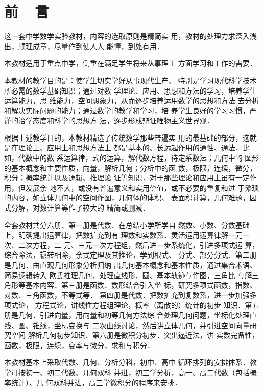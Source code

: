 \chapter{前~~言}

这一套中学数学实验教材，内容的选取原则是精简实
用，教材的处理力求深入浅出，顺理成章，尽量作到使人人
能懂，到处有用．

    本教材适用于重点中学，侧重在满足学生将来从事理工
方面学习和工作的需要．

    本教材的教学目的是：使学生切实学好从事现代生产、
特别是学习现代科学技术所必需的数学基础知识；通过对数
学理论、应用、思想和方法的学习，培养学生运算能力，思
维能力，空间想象力，从而逐步培养运用数学的思想和方法
去分析和解决实际问题的能力；通过数学的教学和学习，培
养学生良好的学习习惯，严谨的治学态度和科学的思想方
法，逐步形成辩证唯物主义世界观．

   根据上述教学目的，本教材精选了传统数学那些普遍实
用的最基础的部分，这就是在理论上、应用上和思想方法上
都是基本的、长远起作用的通性、通法．比如，代数中的数
系运算律，式的运算，解代数方程，待定系数法；几何中的
图形的基本概念和主要性质，向量，解析几何；分析中的函
数，极限，连续，微分，积分；概率统计以及逻辑、推理论
证等知识．对于那些理论和应用上虽有一定作用，但发展余
地不大，或没有普遍意义和实用价值，或不必要的重复和过
于繁琐的内容，如立体几何中的空间作图，几何体的体积、
表面积计算，几何难题，因式分解，对数计算等作了较大的
精简或删减．

    全套教材共分六册．第一册是代数．在总结小学所学自
然数、小数、分数基础上，明确提出运算律，把数扩充到有
理数和实数系．灵活运用运算律解一元一次、二次方程，二
元、三元一次方程组，然后进一步系统化，引进多项式运
算，综合除法，辗转相除，余式定理及其推论，学到根式、
分式、部分分式．第二册是几何．由直观几何形象分析归纳
出几何基本概念和基本性质，通过集合术语、简易逻辑转入
欧氏推理几何，处理直线形，圆、基本轨迹与作图，三角比
与解三角形等基本内容．第三册是函数．数形结合引入坐
标，研究多项式函数，指数、对数、三角函数，不等式等．
第四册是代数．把数扩充到复数系，进一步加强多项式论，
方程式论，讲线性方程组理论，概率（离散的）统计的初步
知识．第五册是几何．引进向量，用向量和初等几何方法综
合处理几何问题，坐标化处理直线、圆、锥线，坐标变换与
二次曲线讨论，然后讲立体几何，并引进空间向量研究空间
解析几何初步知识．第六册是微积分初步．突出逼近法，讲
实数完备性，函数，极限，连续，变率与微分，求和与积分．

本教材基本上采取代数、几何、分析分科，初中、高中
循环排列的安排体系．教学可按初一、初二代数、几何双科
并进，初三学分析，高一、高二代数（包括概率统计）、几
何双科并进，高三学微积分的程序来安排．

